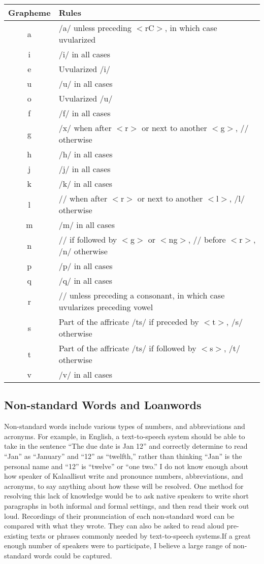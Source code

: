 \documentclass[12pt]{article}
\begin{document}
	\begin{tabular}{|c|l|}
	\hline
	Grapheme & Rules \\
	\hline
	a & /a/ unless preceding $<$rC$>$, in which case uvularized\\
	i & /i/ in all cases\\
	e & Uvularized /i/\\
	u & /u/ in all cases\\
	o & Uvularized /u/\\
	f & /f/ in all cases\\
	g & /x/ when after $<$r$>$ or next to another $<$g$>$, /\textipa{G}/ otherwise\\
	h & /h/ in all cases\\
	j & /j/ in all cases\\
	k & /k/ in all cases\\
	l & /\textbeltl/ when after $<$r$>$ or next to another $<$l$>$, /l/ otherwise\\
	m & /m/ in all cases\\
	n & /\textipa{N}/ if followed by $<$g$>$ or $<$ng$>$, /\textscn/ before $<$r$>$, /n/ otherwise\\
	p & /p/ in all cases\\
	q & /q/ in all cases\\
	r & /\textinvscr/ unless preceding a consonant, in which case uvularizes preceding vowel\\
	s & Part of the affricate /ts/ if preceded by $<$t$>$, /s/ otherwise\\
	t & Part of the affricate /ts/ if followed by $<$s$>$, /t/ otherwise\\
	v & /v/ in all cases\\
	\hline
	\end{tabular}

	\subsection{Non-standard Words and Loanwords}

	Non-standard words include various types of numbers, and abbreviations and acronyms. For example, in English, a text-to-speech system should be able to take in the sentence ``The due date is Jan 12'' and correctly determine to read ``Jan'' as ``January'' and ``12'' as ``twelfth,'' rather than thinking ``Jan'' is the personal name and ``12'' is ``twelve'' or ``one two.'' I do not know enough about how speaker of Kalaallisut write and pronounce numbers, abbreviations, and acronyms, to say anything about how these will be resolved. One method for resolving this lack of knowledge would be to ask native speakers to write short paragraphs in both informal and formal settings, and then read their work out loud. Recordings of their pronunciation of each non-standard word can be compared with what they wrote. They can also be asked to read aloud pre-existing texts or phrases commonly needed by text-to-speech systems.If a great enough number of speakers were to participate, I believe a large range of non-standard words could be captured. \par
\end{document}
